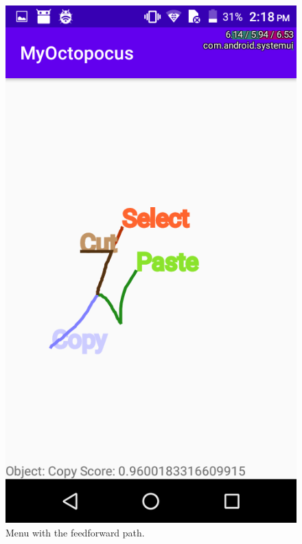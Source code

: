 \documentclass[11pt,twocolumn]{scrartcl}
\begin{document}
\begin{figure}[!h]
	\label{fig:menu}
	\begin{center}
		\includegraphics[scale=0.3]{./img/myoctopocus.png}
		\caption{Menu with the feedforward path.}
	\end{center}
\end{figure}
\end{document}
